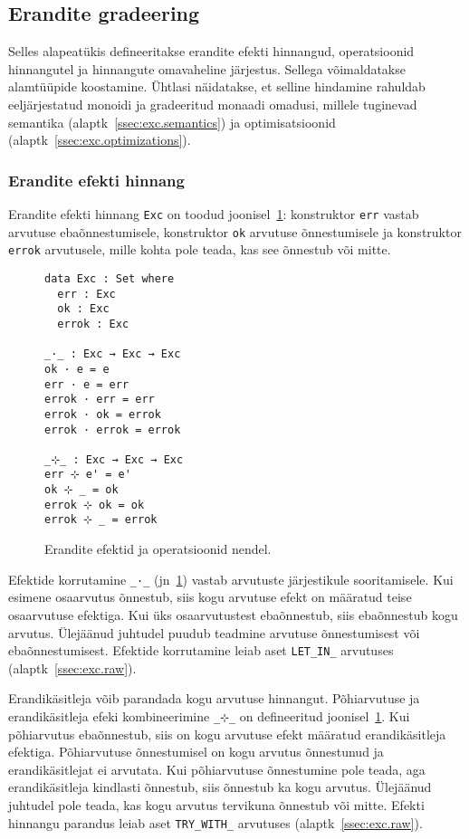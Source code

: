 \documentclass[a4paper,12pt]{article}
\begin{document}
\subsection{Erandite gradeering}\label{ssec:exc.grading}

Selles alapeatükis defineeritakse erandite efekti hinnangud, operatsioonid hinnangutel ja hinnangute omavaheline järjestus.
Sellega võimaldatakse alamtüüpide koostamine.
Ühtlasi näidatakse, et selline hindamine rahuldab eeljärjestatud monoidi ja gradeeritud monaadi omadusi,
millele tuginevad semantika (alaptk~\ref{ssec:exc.semantics}) ja optimisatsioonid (alaptk~\ref{ssec:exc.optimizations}). 

\subsubsection{Erandite efekti hinnang}\label{sssec:exc.exc}

Erandite efekti hinnang {\tt Exc} on toodud joonisel~\ref{fig:exc.exc}:
konstruktor {\tt err} vastab arvutuse ebaõnnestumisele,
konstruktor {\tt ok} arvutuse õnnestumisele ja konstruktor {\tt errok} arvutusele,
mille kohta pole teada, kas see õnnestub või mitte.

\begin{figure}
  \begin{BVerbatim}
data Exc : Set where
  err : Exc
  ok : Exc
  errok : Exc

_·_ : Exc → Exc → Exc
ok · e = e
err · e = err
errok · err = err
errok · ok = errok
errok · errok = errok

_⊹_ : Exc → Exc → Exc
err ⊹ e' = e'
ok ⊹ _ = ok
errok ⊹ ok = ok
errok ⊹ _ = errok
  \end{BVerbatim}
  \caption{Erandite efektid ja operatsioonid nendel.}
  \label{fig:exc.exc}
\end{figure}

Efektide korrutamine {\tt _·_} (jn~\ref{fig:exc.exc}) vastab arvutuste järjestikule sooritamisele.
Kui esimene osaarvutus õnnestub, siis kogu arvutuse efekt on määratud teise osaarvutuse efektiga.
Kui üks osaarvutustest ebaõnnestub, siis ebaõnnestub kogu arvutus.
Ülejäänud juhtudel puudub teadmine arvutuse õnnestumisest või ebaõnnestumisest.
Efektide korrutamine leiab aset {\tt LET_IN_} arvutuses (alaptk~\ref{ssec:exc.raw}).

Erandikäsitleja võib parandada kogu arvutuse hinnangut.
Põhiarvutuse ja erandikäsitleja efeki kombineerimine {\tt _⊹_} on defineeritud joonisel~\ref{fig:exc.exc}.
Kui põhiarvutus ebaõnnestub, siis on kogu arvutuse efekt määratud erandikäsitleja efektiga.
Põhiarvutuse õnnestumisel on kogu arvutus õnnestunud ja erandikäsitlejat ei arvutata.
Kui põhiarvutuse õnnestumine pole teada, aga erandikäsitleja kindlasti õnnestub, siis õnnestub ka kogu arvutus.
Ülejäänud juhtudel pole teada, kas kogu arvutus tervikuna õnnestub või mitte.
Efekti hinnangu parandus leiab aset {\tt TRY_WITH_} arvutuses (alaptk~\ref{ssec:exc.raw}).
\end{document}
